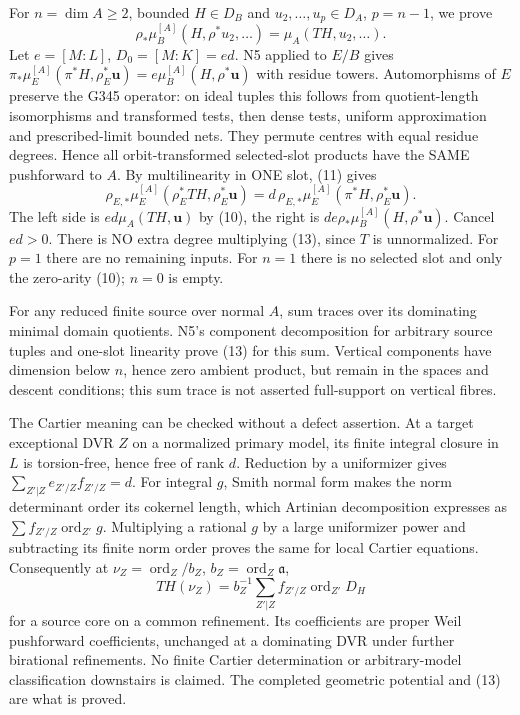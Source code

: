 For $n=\dim A\ge2$, bounded $H\in D_B$ and $u_2,\ldots,u_p\in D_A$, $p=n-1$, we prove
\[
 \rho_*\mu_B^{[A]}(H,\rho^*u_2,\ldots)=\mu_A(TH,u_2,\ldots). \tag{13}
\]
Let $e=[M:L]$, $D_0=[M:K]=ed$. N5 applied to $E/B$ gives
$\pi_*\mu_E^{[A]}(\pi^*H,\rho_E^*\boldsymbol u)=e\mu_B^{[A]}(H,\rho^*\boldsymbol u)$ with residue towers. Automorphisms of $E$ preserve the G345 operator: on ideal tuples this follows from quotient-length isomorphisms and transformed tests, then dense tests, uniform approximation and prescribed-limit bounded nets. They permute centres with equal residue degrees. Hence all orbit-transformed selected-slot products have the SAME pushforward to $A$. By multilinearity in ONE slot, (11) gives
\[
 \rho_{E,*}\mu_E^{[A]}(\rho_E^*TH,\rho_E^*\boldsymbol u)
 =d\,\rho_{E,*}\mu_E^{[A]}(\pi^*H,\rho_E^*\boldsymbol u).
\]
The left side is $ed\mu_A(TH,\boldsymbol u)$ by (10), the right is $de\rho_*\mu_B^{[A]}(H,\rho^*\boldsymbol u)$. Cancel $ed>0$. There is NO extra degree multiplying (13), since $T$ is unnormalized. For $p=1$ there are no remaining inputs. For $n=1$ there is no selected slot and only the zero-arity (10); $n=0$ is empty.

For any reduced finite source over normal $A$, sum traces over its dominating minimal domain quotients. N5's component decomposition for arbitrary source tuples and one-slot linearity prove (13) for this sum. Vertical components have dimension below $n$, hence zero ambient product, but remain in the spaces and descent conditions; this sum trace is not asserted full-support on vertical fibres.

The Cartier meaning can be checked without a defect assertion. At a target exceptional DVR $Z$ on a normalized primary model, its finite integral closure in $L$ is torsion-free, hence free of rank $d$. Reduction by a uniformizer gives $\sum_{Z'|Z}e_{Z'/Z}f_{Z'/Z}=d$. For integral $g$, Smith normal form makes the norm determinant order its cokernel length, which Artinian decomposition expresses as $\sum f_{Z'/Z}\operatorname{ord}_{Z'}g$. Multiplying a rational $g$ by a large uniformizer power and subtracting its finite norm order proves the same for local Cartier equations. Consequently at $\nu_Z=\operatorname{ord}_Z/b_Z$, $b_Z=\operatorname{ord}_Z\mathfrak a$,
\[
 TH(\nu_Z)=b_Z^{-1}\sum_{Z'|Z} f_{Z'/Z}\operatorname{ord}_{Z'}D_H
\]
for a source core on a common refinement. Its coefficients are proper Weil pushforward coefficients, unchanged at a dominating DVR under further birational refinements. No finite Cartier determination or arbitrary-model classification downstairs is claimed. The completed geometric potential and (13) are what is proved.


